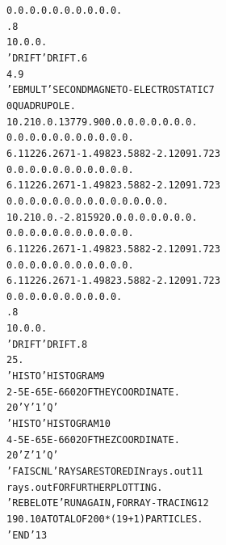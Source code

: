 \begin{tiny}
\begin{center}
\begin{alltt}
  0.  0. 0. 0. 0. 0. 0. 0. 0. 0.                                                 
  .8                                                                             
  1 0. 0. 0.                                                                     
  'DRIFT'                                       DRIFT.                          6      
  4.9                                                                            
  'EBMULT'                                      SECOND MAGNETO-ELECTROSTATIC    7      
   0                                                             QUADRUPOLE.     
  10.2  10. 0.  13779.90  0. 0. 0. 0. 0. 0. 0. 0.                                
   0.  0.  0.  0.  0.  0.  0. 0. 0. 0. 0.                                        
  6  .1122 6.2671 -1.4982 3.5882 -2.1209 1.723                                   
   0.  0.  0.  0.  0.  0.  0. 0. 0. 0. 0.                                        
  6  .1122 6.2671 -1.4982 3.5882 -2.1209 1.723                                   
  0. 0. 0. 0. 0. 0. 0. 0. 0. 0. 0. 0. 0. 0.                                      
  10.2  10. 0.   -2.81592  0. 0. 0. 0. 0. 0. 0. 0.                               
   0.  0.  0.  0.  0.  0.  0. 0. 0. 0. 0.                                        
  6  .1122 6.2671 -1.4982 3.5882 -2.1209 1.723                                   
   0.  0.  0.  0.  0.  0.  0. 0. 0. 0. 0.                                        
  6  .1122 6.2671 -1.4982 3.5882 -2.1209 1.723                                   
  0. 0. 0. 0. 0. 0. 0. 0. 0. 0.                                                  
  .8                                                                             
  1 0. 0. 0.                                                                     
  'DRIFT'                                       DRIFT.                          8      
  25.                                                                            
  'HISTO'                                       HISTOGRAM                       9      
  2  -5E-6  5E-6     60  2                      OF THE Y COORDINATE.           
  20  'Y'  1  'Q'                                                                
  'HISTO'                                       HISTOGRAM                      10      
  4  -5E-6  5E-6     60  2                      OF THE Z COORDINATE.           
  20  'Z'  1  'Q'                                                                
  'FAISCNL'                           RAYS ARE STORED IN rays.out              11      
  rays.out                            FOR FURTHER PLOTTING.   
  'REBELOTE'                          RUN AGAIN, FOR RAY-TRACING               12      
  19  0.1 0                           A TOTAL OF 200*(19+1) PARTICLES. 
  'END'                                                                        13 
\end{alltt}
\end{center}


\end{tiny}
